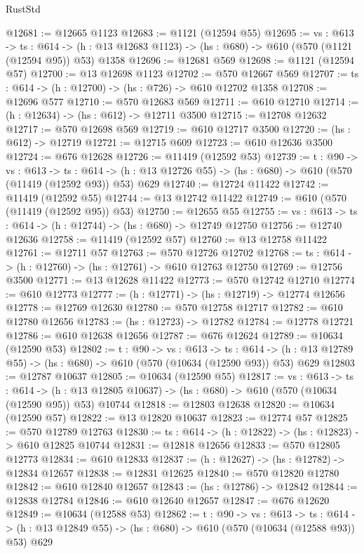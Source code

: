 \begin{lexlean}{RustStd}
\begin{coremodule}
@12681 := @12665 @1123
@12683 := @1121 (@12594 @55)
@12695 := {vs : @613} ->
  {ts : @614} -> (h : @13 @12683 @1123) -> (hs : @680) -> @610 (@570 (@1121 (@12594 @95)) @53) @1358
@12696 := @12681 @569
@12698 := @1121 (@12594 @57)
@12700 := @13 @12698 @1123
@12702 := @570 @12667 @569
@12707 := {ts : @614} -> (h : @12700) -> (hs : @726) -> @610 @12702 @1358
@12708 := @12696 @577
@12710 := @570 @12683 @569
@12711 := @610 @12710
@12714 := (h : @12634) -> (hs : @612) -> @12711 @3500
@12715 := @12708 @12632
@12717 := @570 @12698 @569
@12719 := @610 @12717 @3500
@12720 := (hs : @612) -> @12719
@12721 := @12715 @609
@12723 := @610 @12636 @3500
@12724 := @676 @12628
@12726 := @11419 (@12592 @53)
@12739 := {t : @90} ->
  {vs : @613} ->
  {ts : @614} -> (h : @13 @12726 @55) -> (hs : @680) -> @610 (@570 (@11419 (@12592 @93)) @53) @629
@12740 := @12724 @11422
@12742 := @11419 (@12592 @55)
@12744 := @13 @12742 @11422
@12749 := @610 (@570 (@11419 (@12592 @95)) @53)
@12750 := @12655 @55
@12755 := {vs : @613} -> {ts : @614} -> (h : @12744) -> (hs : @680) -> @12749 @12750
@12756 := @12740 @12636
@12758 := @11419 (@12592 @57)
@12760 := @13 @12758 @11422
@12761 := @12711 @57
@12763 := @570 @12726 @12702
@12768 := {ts : @614} -> (h : @12760) -> (hs : @12761) -> @610 @12763 @12750
@12769 := @12756 @3500
@12771 := @13 @12628 @11422
@12773 := @570 @12742 @12710
@12774 := @610 @12773
@12777 := (h : @12771) -> (hs : @12719) -> @12774 @12656
@12778 := @12769 @12630
@12780 := @570 @12758 @12717
@12782 := @610 @12780 @12656
@12783 := (hs : @12723) -> @12782
@12784 := @12778 @12721
@12786 := @610 @12638 @12656
@12787 := @676 @12624
@12789 := @10634 (@12590 @53)
@12802 := {t : @90} ->
  {vs : @613} ->
  {ts : @614} -> (h : @13 @12789 @55) -> (hs : @680) -> @610 (@570 (@10634 (@12590 @93)) @53) @629
@12803 := @12787 @10637
@12805 := @10634 (@12590 @55)
@12817 := {vs : @613} ->
  {ts : @614} ->
  (h : @13 @12805 @10637) -> (hs : @680) -> @610 (@570 (@10634 (@12590 @95)) @53) @10744
@12818 := @12803 @12638
@12820 := @10634 (@12590 @57)
@12822 := @13 @12820 @10637
@12823 := @12774 @57
@12825 := @570 @12789 @12763
@12830 := {ts : @614} -> (h : @12822) -> (hs : @12823) -> @610 @12825 @10744
@12831 := @12818 @12656
@12833 := @570 @12805 @12773
@12834 := @610 @12833
@12837 := (h : @12627) -> (hs : @12782) -> @12834 @12657
@12838 := @12831 @12625
@12840 := @570 @12820 @12780
@12842 := @610 @12840 @12657
@12843 := (hs : @12786) -> @12842
@12844 := @12838 @12784
@12846 := @610 @12640 @12657
@12847 := @676 @12620
@12849 := @10634 (@12588 @53)
@12862 := {t : @90} ->
  {vs : @613} ->
  {ts : @614} -> (h : @13 @12849 @55) -> (hs : @680) -> @610 (@570 (@10634 (@12588 @93)) @53) @629

\end{coremodule}
\end{lexlean}
